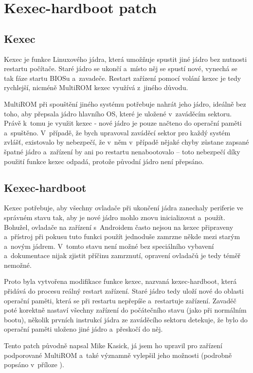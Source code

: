 \documentclass[12pt, a4paper, oneside]{article}
\begin{document}
\section {Kexec-hardboot patch}
\subsection{Kexec}
Kexec je funkce Linuxového jádra, která umožňuje spustit jiné jádro bez nutnosti restartu počítače. Staré jádro se ukončí a~místo něj se spustí nové, vynechá se tak fáze startu BIOSu a~zavadeče. Restart zařízení pomocí volání kexec je tedy rychlejší, nicméně MultiROM kexec využívá z~jiného důvodu.

MultiROM při spouštění jiného systému potřebuje nahrát jeho jádro, ideálně bez toho, aby přepsala jádro hlavního OS, které je uložené v~zaváděcím sektoru. Právě k~tomu je využit kexec - nové jádro je pouze načteno do operační paměti a~spuštěno. V~případě, že bych upravoval zaváděcí sektor pro každý systém zvlášť, existovalo by nebezpečí, že v~něm v~případě nějaké chyby zůstane zapsané špatné jádro a~zařízení by ani po restartu nenabootovalo -- toto nebezpečí díky použití funkce kexec odpadá, protože původní jádro není přepsáno.

\subsection{Kexec-hardboot}
Kexec potřebuje, aby všechny ovladače při ukončení jádra zanechaly periferie ve správném stavu tak, aby je nové jádro mohlo znovu inicializovat a~použít. Bohužel, ovladače na zařízení s~Androidem často nejsou na kexec připraveny a~přístroj při pokusu tuto funkci použít jednoduše zamrzne někde mezi starým a~novým jádrem. V~tomto stavu není možné bez speciálního vybavení a~dokumentace nijak zjistit příčinu zamrznutí, opravení ovladačů je tedy téměř nemožné.

Proto byla vytvořena modifikace funkce kexec, nazvaná kexec-hardboot, která přidává do procesu reálný restart zařízení. Staré jádro tedy uloží nové do oblasti operační paměti, která se při restartu nepřepíše a~restartuje zařízení. Zavaděč poté korektně nastaví všechny zařízení do počátečního stavu (jako při normálním bootu), několik prvních instrukcí jádra ze zaváděcího sektoru detekuje, že bylo do operační paměti uloženo jiné jádro a~přeskočí do něj.

Tento patch původně napsal Mike Kasick\cite{kexec-hardboot-orig}, já jsem ho upravil pro zařízení podporované MultiROM a~také významně vylepšil jeho možnosti (podrobně popsáno v~příloze ).
\end{document}
